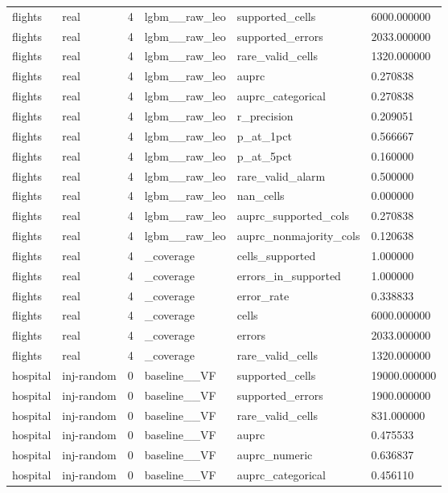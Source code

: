 \begin{tabular}{llllll}
flights & real & 4 & lgbm\_\_raw\_leo & supported\_cells & 6000.000000 \\
flights & real & 4 & lgbm\_\_raw\_leo & supported\_errors & 2033.000000 \\
flights & real & 4 & lgbm\_\_raw\_leo & rare\_valid\_cells & 1320.000000 \\
flights & real & 4 & lgbm\_\_raw\_leo & auprc & 0.270838 \\
flights & real & 4 & lgbm\_\_raw\_leo & auprc\_categorical & 0.270838 \\
flights & real & 4 & lgbm\_\_raw\_leo & r\_precision & 0.209051 \\
flights & real & 4 & lgbm\_\_raw\_leo & p\_at\_1pct & 0.566667 \\
flights & real & 4 & lgbm\_\_raw\_leo & p\_at\_5pct & 0.160000 \\
flights & real & 4 & lgbm\_\_raw\_leo & rare\_valid\_alarm & 0.500000 \\
flights & real & 4 & lgbm\_\_raw\_leo & nan\_cells & 0.000000 \\
flights & real & 4 & lgbm\_\_raw\_leo & auprc\_supported\_cols & 0.270838 \\
flights & real & 4 & lgbm\_\_raw\_leo & auprc\_nonmajority\_cols & 0.120638 \\
flights & real & 4 & \_coverage & cells\_supported & 1.000000 \\
flights & real & 4 & \_coverage & errors\_in\_supported & 1.000000 \\
flights & real & 4 & \_coverage & error\_rate & 0.338833 \\
flights & real & 4 & \_coverage & cells & 6000.000000 \\
flights & real & 4 & \_coverage & errors & 2033.000000 \\
flights & real & 4 & \_coverage & rare\_valid\_cells & 1320.000000 \\
hospital & inj-random & 0 & baseline\_\_VF & supported\_cells & 19000.000000 \\
hospital & inj-random & 0 & baseline\_\_VF & supported\_errors & 1900.000000 \\
hospital & inj-random & 0 & baseline\_\_VF & rare\_valid\_cells & 831.000000 \\
hospital & inj-random & 0 & baseline\_\_VF & auprc & 0.475533 \\
hospital & inj-random & 0 & baseline\_\_VF & auprc\_numeric & 0.636837 \\
hospital & inj-random & 0 & baseline\_\_VF & auprc\_categorical & 0.456110 \\

\end{tabular}
